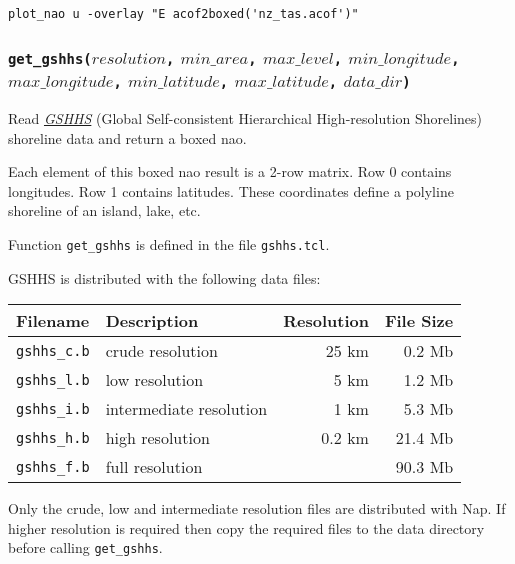 \begin{verbatim}
plot_nao u -overlay "E acof2boxed('nz_tas.acof')"
\end{verbatim}

\subsubsection{\texttt{get\_gshhs(}$\mathit{resolution}$\texttt{,} 
$\mathit{min\_area}$\texttt{,} 
$\mathit{max\_level}$\texttt{,} 
$\mathit{min\_longitude}$\texttt{,} 
$\mathit{max\_longitude}$\texttt{,} 
$\mathit{min\_latitude}$\texttt{,} 
$\mathit{max\_latitude}$\texttt{,} 
$\mathit{data\_dir}$\texttt{)}}
    \label{geog-get-gshhs}

Read 
\href{http://www.ngdc.noaa.gov/mgg/shorelines/gshhs.html}
{\emph{GSHHS}}
(Global Self-consistent Hierarchical High-resolution Shorelines)
shoreline data and return a boxed nao.

Each element of this boxed nao result is a 2-row matrix.
Row 0 contains longitudes.
Row 1 contains latitudes.
These coordinates define a polyline shoreline of an island, lake, etc.

Function \texttt{get\_gshhs} is defined in the file \texttt{gshhs.tcl}.

GSHHS is distributed with the following data files:

\begin{tabular}{|l|l|r|r|}
\hline
Filename & Description & Resolution & File Size \\
\hline
\texttt{gshhs\_c.b} & crude resolution & 25 km & 0.2 Mb \\
\texttt{gshhs\_l.b} & low resolution & 5 km & 1.2 Mb \\
\texttt{gshhs\_i.b} & intermediate resolution & 1 km & 5.3 Mb \\
\texttt{gshhs\_h.b} & high resolution & 0.2 km & 21.4 Mb \\
\texttt{gshhs\_f.b} & full resolution &   & 90.3 Mb \\
\hline
\end{tabular}

Only the crude, low and intermediate resolution files are distributed with Nap.
If higher resolution is required then copy the required files to the data directory before
calling \texttt{get\_gshhs}.

